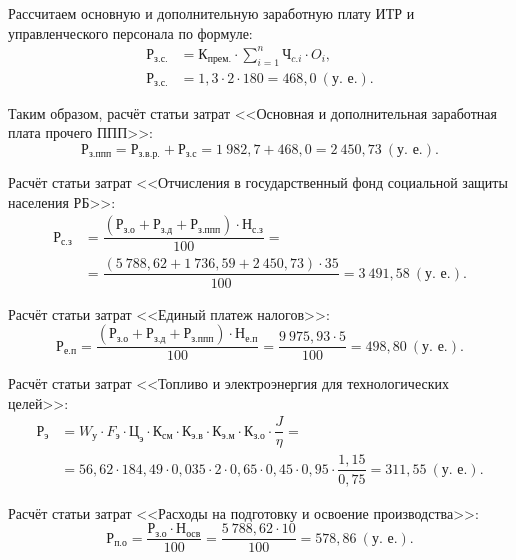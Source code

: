 Рассчитаем основную и дополнительную заработную плату ИТР и управленческого
персонала по формуле:
\begin{align*}
  \text{Р}_{\text{з.с.}} &= \text{К}_{\text{прем.}} \cdot \sum\limits_{i=1}^n \text{Ч}_{c.i} \cdot O_i, \\
  \text{Р}_{\text{з.с.}} &= 1{,}3 \cdot 2 \cdot 180 = 468{,}0~(\text{у.~е.}).
\end{align*}

Таким образом, расчёт статьи затрат <<Основная и дополнительная заработная плата
прочего ППП>>:
\begin{equation*}
\text{Р}_{\text{з.ппп}} = \text{Р}_{\text{з.в.р.}} + \text{Р}_{\text{з.с}} =
1~982{,}7+468{,}0 = 2~450{,}73~(\text{у.~е.}).
\end{equation*}


Расчёт статьи затрат
<<Отчисления в государственный фонд социальной защиты населения РБ>>:
\begin{align*}
\text{Р}_{\text{с.з}} &=
\dfrac{
  (\text{Р}_{\text{з.о}} + \text{Р}_{\text{з.д}}  + \text{Р}_{\text{з.ппп}}) \cdot \text{Н}_{\text{с.з}}
}{
  100
} = \\
&= \dfrac{( 5~788{,}62 + 1~736{,}59 + 2~450{,}73 ) \cdot 35}{100} =
3~491{,}58~(\text{у.~е.}).
\end{align*}

Расчёт статьи затрат
<<Единый платеж налогов>>:
\begin{equation*}
\text{Р}_{\text{е.п}} =
\dfrac{
  (\text{Р}_{\text{з.о}} + \text{Р}_{\text{з.д}}  + \text{Р}_{\text{з.ппп}}) \cdot \text{Н}_{\text{е.п}}
}{
  100
} =
\dfrac{9~975{,}93 \cdot 5}{100} =
498{,}80 \: (\text{у.~е.}).
\end{equation*}

Расчёт статьи затрат
<<Топливо и электроэнергия для технологических целей>>:
\begin{align*}
\text{Р}_{\text{э}} &=
W_{\text{у}} \cdot F_{\text{э}} \cdot \text{Ц}_{\text{э}} \cdot
\text{К}_{\text{см}} \cdot \text{К}_{\text{э.в}} \cdot
\text{К}_{\text{э.м}} \cdot \text{К}_{\text{з.о}} \cdot
\dfrac{J}{\eta} = \\
 &=
56{,}62 \cdot 184{,}49 \cdot 0{,}035 \cdot
2 \cdot 0{,}65 \cdot 0{,}45 \cdot 0{,}95 \cdot
\dfrac{1{,}15}{0{,}75} = 311{,}55~(\text{у.~е.}).
\end{align*}

Расчёт статьи затрат
<<Расходы на подготовку и освоение производства>>:
\begin{equation*}
\text{Р}_{\text{п.о}} =
\dfrac{
  \text{Р}_{\text{з.о}} \cdot \text{Н}_{\text{осв}}
}{
  100
} =
\dfrac{5~788{,}62 \cdot 10}{100} =
578{,}86~(\text{у.~е.}).
\end{equation*}


